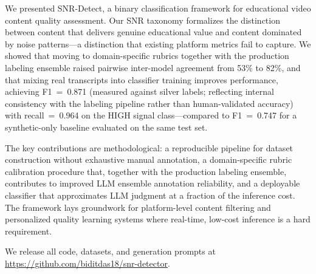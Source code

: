 \documentclass[11pt,a4paper]{article}
\begin{document}
We presented SNR-Detect, a binary classification framework for educational video content quality
assessment. Our SNR taxonomy formalizes the distinction between content that delivers genuine
educational value and content dominated by noise patterns---a distinction that existing platform
metrics fail to capture. We showed that moving to domain-specific rubrics together with the production labeling ensemble
raised pairwise inter-model agreement from 53\% to 82\%, and that mixing real
transcripts into classifier training improves performance, achieving F1~=~0.871 (measured
against silver labels; reflecting internal consistency with the labeling pipeline rather than
human-validated accuracy) with recall~=~0.964 on the HIGH signal class---compared to F1~=~0.747
for a synthetic-only baseline evaluated on the same test set.

The key contributions are methodological: a reproducible pipeline for dataset construction
without exhaustive manual annotation, a domain-specific rubric calibration procedure that, together with the production labeling
ensemble, contributes to improved LLM ensemble annotation reliability, and a deployable classifier that
approximates LLM judgment at a fraction of the inference cost. The framework lays groundwork for
platform-level content filtering and personalized quality learning systems where real-time,
low-cost inference is a hard requirement.

We release all code, datasets, and generation prompts at
\url{https://github.com/biditdas18/snr-detector}.
\end{document}

